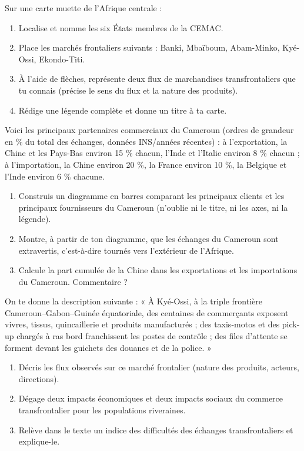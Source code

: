\documentclass[11pt]{article}
\newcommand{\cle}[1]{{\popxbold\color{popdark}#1}}
\begin{document}
\begin{exercice}
Sur une carte muette de l'Afrique centrale :
\begin{enumerate}
\item Localise et nomme les six États membres de la CEMAC.
\item Place les marchés frontaliers suivants : Banki, Mbaïboum, Abam-Minko, Kyé-Ossi, Ekondo-Titi.
\item À l'aide de flèches, représente deux flux de marchandises transfrontaliers que tu connais (précise le sens du flux et la nature des produits).
\item Rédige une légende complète et donne un titre à ta carte.
\end{enumerate}
\end{exercice}

\begin{exercice}
Voici les principaux partenaires commerciaux du Cameroun (ordres de grandeur en \% du total des échanges, données INS/années récentes) : à l'exportation, la Chine et les Pays-Bas environ 15 \% chacun, l'Inde et l'Italie environ 8 \% chacun ; à l'importation, la Chine environ 20 \%, la France environ 10 \%, la Belgique et l'Inde environ 6 \% chacune.
\begin{enumerate}
\item Construis un diagramme en barres comparant les principaux clients et les principaux fournisseurs du Cameroun (n'oublie ni le titre, ni les axes, ni la légende).
\item Montre, à partir de ton diagramme, que les échanges du Cameroun sont \cle{extravertis}, c'est-à-dire tournés vers l'extérieur de l'Afrique.
\item Calcule la part cumulée de la Chine dans les exportations et les importations du Cameroun. Commentaire ?
\end{enumerate}
\end{exercice}

\begin{exercice}
On te donne la description suivante : « À Kyé-Ossi, à la triple frontière Cameroun--Gabon--Guinée équatoriale, des centaines de commerçants exposent vivres, tissus, quincaillerie et produits manufacturés ; des taxis-motos et des pick-up chargés à ras bord franchissent les postes de contrôle ; des files d'attente se forment devant les guichets des douanes et de la police. »
\begin{enumerate}
\item Décris les flux observés sur ce marché frontalier (nature des produits, acteurs, directions).
\item Dégage deux impacts économiques et deux impacts sociaux du commerce transfrontalier pour les populations riveraines.
\item Relève dans le texte un indice des difficultés des échanges transfrontaliers et explique-le.
\end{enumerate}
\end{exercice}
\end{document}
